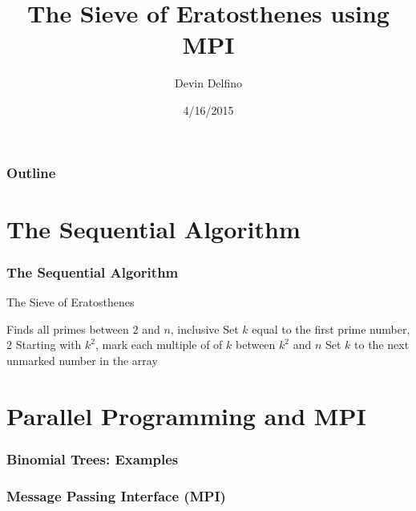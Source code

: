 \documentclass[13pt]{beamer}
\title{The Sieve of Eratosthenes using MPI}
\author{Devin Delfino}
\institute{Comp 401: Senior Seminar}
\date{4/16/2015}
\begin{document}
\frame{\titlepage}


\begin{frame}
\frametitle{Outline}
\tableofcontents
\end{frame}

\section{The Sequential Algorithm} %
\begin{frame}
\frametitle{The Sequential Algorithm}
	\begin{algorithm}[H]
        \caption{The Sieve of Eratosthenes}
        \begin{algorithmic}
          \REQUIRE Finds all primes between $2$ and $n$, inclusive
          \STATE Set $k$ equal to the first prime number, $2$
            \STATE Starting with $k^2$, mark each multiple of of $k$ between $k^2$ and $n$
            \STATE Set $k$ to the next unmarked number in the array
          \ENDWHILE
        \end{algorithmic}
        \end{algorithm}
\end{frame}

\section{Parallel Programming and MPI} %
\begin{frame}
\frametitle{Binomial Trees: Examples}

\end{frame}

\begin{frame}
\frametitle{Message Passing Interface (MPI)}

\end{frame}

\begin{frame}

\end{frame}
\end{document}
